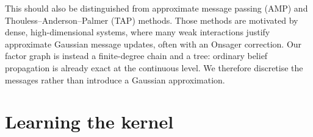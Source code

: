 \documentclass{article}
\begin{document}
This should also be distinguished from approximate message
passing (AMP) and Thouless--Anderson--Palmer (TAP) methods.
Those methods are motivated by dense, high-dimensional
systems, where many weak interactions justify approximate
Gaussian message updates, often with an Onsager correction.
Our factor graph is instead a finite-degree chain and a tree:
ordinary belief propagation is already exact at the
continuous level. We therefore discretise the messages
rather than introduce a Gaussian approximation.
\section{Learning the kernel}
\label{sec:laplace}

\end{document}
